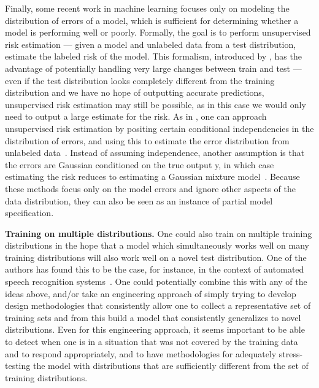 \documentclass[a4paper,10pt]{article}
\begin{document}
Finally, some recent work in machine learning focuses only on modeling the distribution of errors of a model, which is sufficient for determining whether a model is performing well or poorly. Formally, the goal is to perform unsupervised risk estimation --- given a model and unlabeled data from a test distribution, estimate the labeled risk of the model. This formalism, introduced by \cite{donmez2010unsupervised}, has the advantage of potentially handling very large changes between train and test --- even if the test distribution looks completely different from the training distribution and we have no hope of outputting accurate predictions, unsupervised risk estimation may still be possible, as in this case we would only need to output a large estimate for the risk. As in \cite{steinhardt2016unsupervised}, one can approach unsupervised risk estimation by positing certain conditional independencies in the distribution of errors, and using this to estimate the error distribution from unlabeled data~\cite{dawid1979maximum,zhang2014spectral,platanios2015thesis,jaffe2014estimating}. Instead of assuming independence, another assumption is that the errors are Gaussian conditioned on the true output y, in which case estimating the risk reduces to estimating a Gaussian mixture model~\cite{balasubramanian2011unsupervised}. Because these methods focus only on the model errors and ignore other aspects of the data distribution, they can also be seen as an instance of partial model specification.

{\bf Training on multiple distributions.} One could also train on multiple training distributions in the hope that a model which simultaneously works well on many training distributions will also work well on a novel test distribution. One of the authors has found this to be the case, for instance, in the context of automated speech recognition systems~\cite{amodei2015deep}. One could potentially combine this with any of the ideas above, and/or take an engineering approach of simply trying to develop design methodologies that consistently allow one to collect a representative set of training sets and from this build a model that consistently generalizes to novel distributions. Even for this engineering approach, it seems important to be able to detect when one is in a situation that was not covered by the training data and to respond appropriately, and to have methodologies for adequately stress-testing the model with distributions that are sufficiently different from the set of training distributions.
\end{document}
